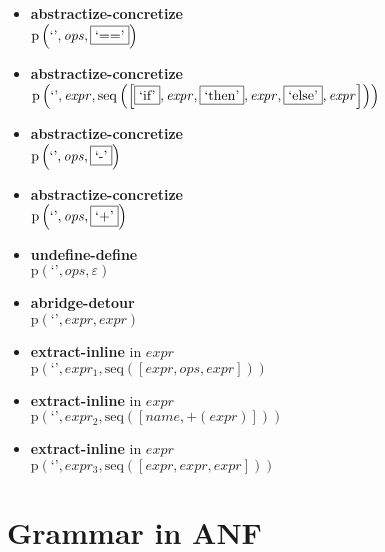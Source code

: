 {\begin{itemize}
\item \textbf{abstractize-concretize}\\$\mathrm{p}\left(\text{`'},\mathit{ops},\fbox{$\text{`=='}$}\right)$
\item \textbf{abstractize-concretize}\\$\mathrm{p}\left(\text{`'},\mathit{expr},\mathrm{seq}\left(\left[\fbox{$\text{`if'}$}, \mathit{expr}, \fbox{$\text{`then'}$}, \mathit{expr}, \fbox{$\text{`else'}$}, \mathit{expr}\right]\right)\right)$
\item \textbf{abstractize-concretize}\\$\mathrm{p}\left(\text{`'},\mathit{ops},\fbox{$\text{`-'}$}\right)$
\item \textbf{abstractize-concretize}\\$\mathrm{p}\left(\text{`'},\mathit{ops},\fbox{$\text{`+'}$}\right)$
\item \textbf{undefine-define}\\$\mathrm{p}\left(\text{`'},\mathit{ops},\varepsilon\right)$
\item \textbf{abridge-detour}\\$\mathrm{p}\left(\text{`'},\mathit{expr},\mathit{expr}\right)$
\item \textbf{extract-inline}  in $\mathit{expr}$\\$\mathrm{p}\left(\text{`'},\mathit{expr_1},\mathrm{seq}\left(\left[\mathit{expr}, \mathit{ops}, \mathit{expr}\right]\right)\right)$
\item \textbf{extract-inline}  in $\mathit{expr}$\\$\mathrm{p}\left(\text{`'},\mathit{expr_2},\mathrm{seq}\left(\left[\mathit{name}, \plus \left(\mathit{expr}\right)\right]\right)\right)$
\item \textbf{extract-inline}  in $\mathit{expr}$\\$\mathrm{p}\left(\text{`'},\mathit{expr_3},\mathrm{seq}\left(\left[\mathit{expr}, \mathit{expr}, \mathit{expr}\right]\right)\right)$
\end{itemize}}

\section{Grammar in ANF}

